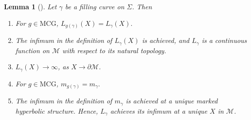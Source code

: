\documentclass[12pt]{amsart}
\numberwithin{equation}{section}
\theoremstyle{plain}
\newtheorem{lem}[thm]{Lemma}
\begin{document}
\begin{lem}[] Let  $\gamma$ be a filling curve on $\Sigma$. Then
 \begin{enumerate}
 \item  For $g \in \text{MCG}$, $L_{g(\gamma)}(X)=L_{\gamma}(X).$
 \item The infimum in the definition of  $L_{\gamma}(X)$ is achieved, and 
 $L_{\gamma}$ is a continuous function on 
  $\mathcal{M}$ with respect to its natural topology. 
\item $L_{\gamma}(X)  \rightarrow \infty$, as $X\rightarrow \partial\mathcal{M}$.
 \item  For $g \in \text{MCG}$, $m_{g(\gamma)}=m_{\gamma}.$
\item The infimum in the definition of  $m_{\gamma}$ is achieved at a unique marked hyperbolic structure. Hence, $L_{\gamma}$ achieves its infimum at a unique $X$ in $\mathcal{M}$.
\end{enumerate}
\end{lem}
\end{document}
